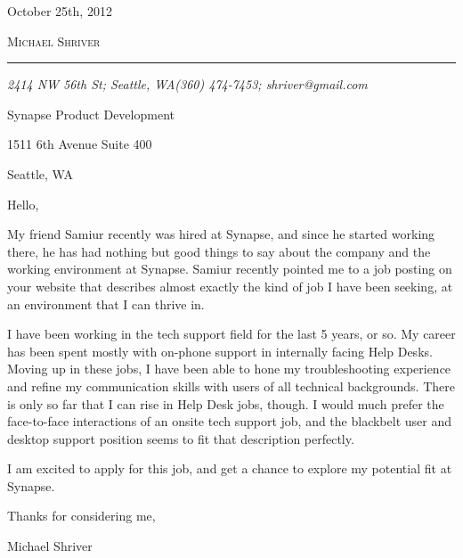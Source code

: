 \documentclass[10pt,oneside]{article}
\makeatletter
\newcommand{\name}{Michael Shriver}
\newcommand{\dte}{October 25th, 2012}
\newcommand{\addr}{2414 NW 56th St; Seattle, WA}
\newcommand{\phone}{(360) 474-7453}
\newcommand{\email}{shriver@gmail.com}
\newcommand{\bigname}[1]{
    \begin{flushleft}\fontfamily{phv}\selectfont\Huge\scshape#1\end{flushleft}
}
\makeatother
\begin{document}
 \selectfont

\hfill\dte

\bigname{\name}


\vspace{-8pt} \rule{\textwidth}{1pt}

\vspace{-1pt} {\small\itshape \addr \hfill \phone; \email}

\vspace{8 pt}


\vspace{\baselineskip}

Synapse Product Development

1511 6th Avenue Suite 400

Seattle, WA

\vspace{\baselineskip}
\vspace{\baselineskip}

Hello,

\vspace{\baselineskip}

My friend Samiur recently was hired at Synapse, and since he started working there, he has had nothing but good things to say about the company and the working environment at Synapse. Samiur recently pointed me to a job posting on your website that describes almost exactly the kind of job I have been seeking, at an environment that I can thrive in.

\vspace{\baselineskip}

I have been working in the tech support field for the last 5 years, or so. My career has been spent mostly with on-phone support in internally facing Help Desks. Moving up in these jobs, I have been able to hone my troubleshooting experience and refine my communication skills with users of all technical backgrounds. There is only so far that I can rise in Help Desk jobs, though. I would much prefer the face-to-face interactions of an onsite tech support job, and the blackbelt user and desktop support position seems to fit that description perfectly.

\vspace{\baselineskip}

I am excited to apply for this job, and get a chance to explore my potential fit at Synapse.

\vspace{\baselineskip}

Thanks for considering me,

\vspace{\baselineskip}

Michael Shriver
\end{document}
